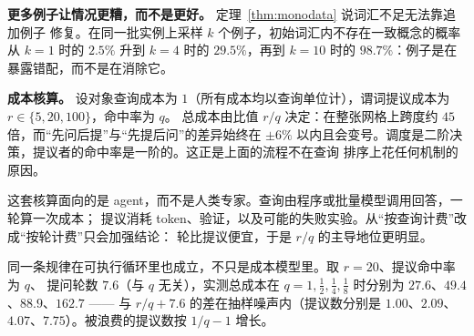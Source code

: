 \documentclass[11pt]{ctexart}
\begin{document}
\textbf{更多例子让情况更糟，而不是更好。} 定理~\ref{thm:monodata} 说词汇不足无法靠追加例子
修复。在同一批实例上采样 $k$ 个例子，初始词汇内不存在一致概念的概率从 $k=1$ 时的 $2.5\%$
升到 $k=4$ 时的 $29.5\%$，再到 $k=10$ 时的 $98.7\%$：例子是在暴露错配，而不是在消除它。

\textbf{成本核算。} 设对象查询成本为 $1$（所有成本均以查询单位计），谓词提议成本为 $r \in \{5, 20, 100\}$，命中率为 $q$。
总成本由比值 $r/q$ 决定：在整张网格上跨度约 $45$ 倍，而“先问后提”与“先提后问”的差异始终在
$\pm 6\%$ 以内且会变号。调度是二阶决策，提议者的命中率是一阶的。这正是上面的流程不在查询
排序上花任何机制的原因。

这套核算面向的是 agent，而不是人类专家。查询由程序或批量模型调用回答，一轮算一次成本；
提议消耗 token、验证，以及可能的失败实验。从“按查询计费”改成“按轮计费”只会加强结论：
轮比提议便宜，于是 $r/q$ 的主导地位更明显。

同一条规律在可执行循环里也成立，不只是成本模型里。取 $r = 20$、提议命中率为 $q$、
提问轮数 $7.6$（与 $q$ 无关），实测总成本在 $q = 1, \tfrac12, \tfrac14, \tfrac18$ 时分别为
$27.6$、$49.4$、$88.9$、$162.7$ —— 与 $r/q + 7.6$ 的差在抽样噪声内（提议数分别是 $1.00$、$2.09$、
$4.07$、$7.75$）。被浪费的提议数按 $1/q - 1$ 增长。
\end{document}
